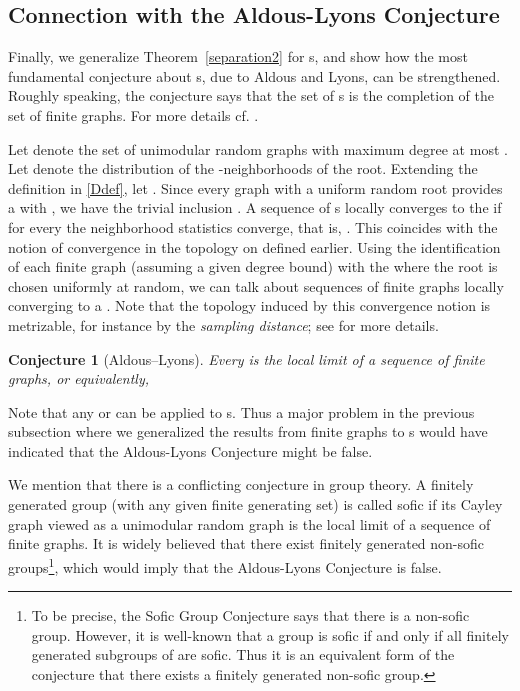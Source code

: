 \documentclass[12pt,a4paper]{article}
\newtheorem{Conjecture}[Theorem]{Conjecture}
\renewcommand{\:}{\colon}
\begin{document}
\subsection{Connection with the Aldous-Lyons Conjecture}

Finally, we generalize Theorem~\ref{separation2} for s, and show how the most fundamental conjecture about s, due to Aldous and Lyons, can be strengthened. 
Roughly speaking, the conjecture says that the set of s is the completion of the set of finite graphs. 
For more details cf. \cite{AlLy, Lovasz}. 

Let  denote the set of unimodular random graphs  with maximum degree at most . 
Let  denote the distribution of the -neighborhoods of the root. 
Extending the definition in \eqref{Ddef}, let . 
Since every graph  with a uniform random root provides a  with , we have the trivial inclusion . 
A sequence of s  locally converges to the   if for every  the neighborhood statistics converge, that is, . 
This coincides with the notion of convergence in the topology on  defined earlier. 
Using the identification of each finite graph (assuming a given degree bound) with the  where the root is chosen uniformly at random, we can talk about sequences of finite graphs locally converging to a . 
Note that the topology induced by this convergence notion is metrizable, for instance by the \emph{sampling distance};  see \cite{Lovaszbook} for more details. 

\begin{Conjecture}[Aldous--Lyons]
Every  is the local limit of a sequence of finite graphs, or equivalently,

\end{Conjecture}

Note that any  or  can be applied to s. 
Thus a major problem in the previous subsection where we generalized the results from finite graphs to s would have indicated that the Aldous-Lyons Conjecture might be false. 

We mention that there is a conflicting conjecture in group theory. 
A finitely generated group (with any given finite generating set) is called sofic if its Cayley graph viewed as a unimodular random graph is the local limit of a sequence of finite graphs. 
It is widely believed that there exist finitely generated non-sofic groups\footnote{To be precise, the Sofic Group Conjecture says that there is a non-sofic group. However, it is well-known that a group  is sofic if and only if all finitely generated subgroups of  are sofic. Thus it is an equivalent form of the conjecture that there exists a finitely generated non-sofic group.}, which would imply that the Aldous-Lyons Conjecture is false. 
\end{document}
